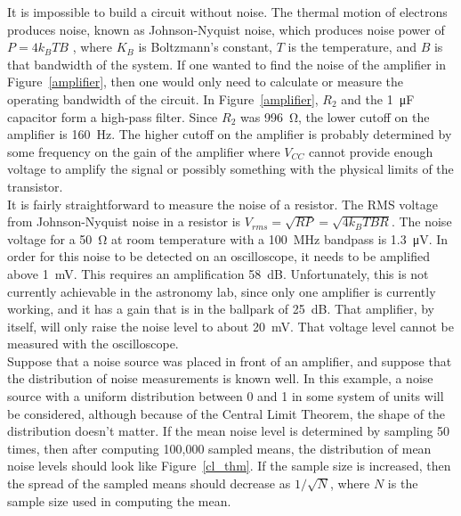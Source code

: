 \documentclass[11pt,letterpaper]{article}
\begin{document}
It is impossible to build a circuit without noise. The thermal motion of
electrons produces noise, known as Johnson-Nyquist noise, which produces noise
power of $P = 4 k_B T B$ \cite{JNWikipedia}, where $K_B$ is Boltzmann's
constant, $T$ is the temperature, and $B$ is that bandwidth of the system. If
one wanted to find the noise of the amplifier in Figure~\ref{amplifier}, then
one would only need to calculate or measure the operating bandwidth of the
circuit. In Figure~\ref{amplifier}, $R_2$ and the \SI{1}{\micro\farad} capacitor
form a high-pass filter. Since $R_2$ was \SI{996}{\ohm}, the lower cutoff on the
amplifier is \SI{160}{\hertz}. The higher cutoff on the amplifier is probably
determined by some frequency on the gain of the amplifier where $V_{CC}$ cannot
provide enough voltage to amplify the signal or possibly something with the
physical limits of the transistor.
\\

It is fairly straightforward to measure the noise of a resistor. The RMS voltage
from Johnson-Nyquist noise in a resistor is
$V_{rms} = \sqrt{RP} = \sqrt{4 k_B T B R}$. The noise voltage for a
\SI{50}{\ohm} at room temperature with a \SI{100}{\mega\hertz} bandpass is
\SI{1.3}{\micro\volt}. In order for this noise to be detected on an
oscilloscope, it needs to be amplified above \SI{1}{\milli\volt}. This requires
an amplification \SI{58}{\deci\bel}. Unfortunately, this is not currently
achievable in the astronomy lab, since only one amplifier is currently working,
and it has a gain that is in the ballpark of \SI{25}{\deci\bel}. That amplifier,
by itself, will only raise the noise level to about \SI{20}{\milli\volt}. That
voltage level cannot be measured with the oscilloscope.
\\

Suppose that a noise source was placed in front of an amplifier, and suppose
that the distribution of noise measurements is known well. In this example, a
noise source with a uniform distribution between 0 and 1 in some system of units
will be considered, although because of the Central Limit Theorem, the shape of
the distribution doesn't matter. If the mean noise level is determined by
sampling 50 times, then after computing 100,000 sampled means, the distribution
of mean noise levels should look like Figure~\ref{cl_thm}. If the sample size is
increased, then the spread of the sampled means should decrease as $1/\sqrt{N}$,
where $N$ is the sample size used in computing the mean.\\
\end{document}
